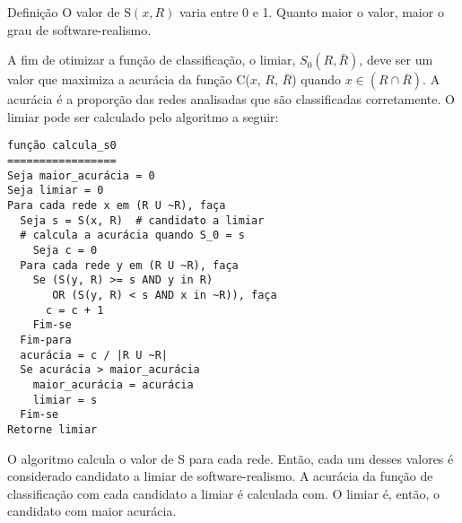 \begin{section}{Definição}
O valor de $\mathrm{S}(x, R)$ varia entre 0 e 1. Quanto maior o valor, maior o grau de software-realismo.

A fim de otimizar a função de classificação, o limiar, $S_0(R, \bar{R})$, deve ser um valor que maximiza a acurácia da função C($x$, $R$, $\bar{R}$) quando $x \in (R \cap \bar{R})$. A acurácia é a proporção das redes analisadas que são classificadas corretamente. O limiar pode ser calculado pelo algoritmo a seguir:

\begin{verbatim}
função calcula_s0
=================
Seja maior_acurácia = 0
Seja limiar = 0
Para cada rede x em (R U ~R), faça
  Seja s = S(x, R)  # candidato a limiar
  # calcula a acurácia quando S_0 = s
	Seja c = 0
  Para cada rede y em (R U ~R), faça
    Se (S(y, R) >= s AND y in R)
       OR (S(y, R) < s AND x in ~R)), faça
      c = c + 1
    Fim-se
  Fim-para
  acurácia = c / |R U ~R|
  Se acurácia > maior_acurácia
    maior_acurácia = acurácia
    limiar = s
  Fim-se
Retorne limiar
\end{verbatim}

O algoritmo calcula o valor de S para cada rede. Então, cada um desses valores é considerado candidato a limiar de software-realismo. A acurácia da função de classificação com cada candidato a limiar é calculada com. O limiar é, então, o candidato com maior acurácia.


\end{section}

